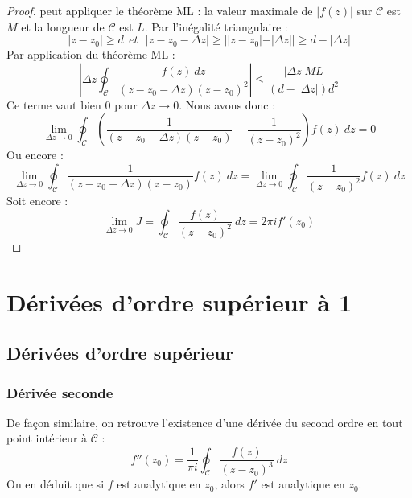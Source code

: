 \begin{proof}
	peut appliquer le théorème ML : la valeur maximale de $|f(z)|$ sur $\mathcal{C}$ est $M$ et la
	longueur de $\mathcal{C}$ est $L$. Par l'inégalité triangulaire :
	\begin{equation}
	|z-z_0| \geq d\ \ et\ \ \ |z-z_0-\Delta z| \geq ||z-z_0| - |\Delta z|| \geq d - |\Delta z|
	\end{equation}
	Par application du théorème ML :
	\begin{equation}
	\left|\Delta z\oint_\mathcal{C} \dfrac{f(z)\ dz}{(z-z_0-\Delta z)(z-z_0)^2}\right| \leq 
	\dfrac{|\Delta z|ML}{(d-|\Delta z|)d^2}
	\end{equation}
	Ce terme vaut bien 0 pour $\Delta z \rightarrow 0$. Nous avons donc :
	\begin{equation}
	\lim\limits_{\Delta z \rightarrow 0} \oint_\mathcal{C}\left(\dfrac{1}{(z-z_0-\Delta z)(z-z_0)} - 
	\dfrac{1}{(z-z_0)^2}\right)f(z)\ dz = 0
	\end{equation}
	Ou encore :
	\begin{equation}
	\lim\limits_{\Delta z \rightarrow 0} \oint_\mathcal{C}\dfrac{1}{(z-z_0-\Delta z)(z-z_0)}
	f(z)\ dz =
	\lim\limits_{\Delta z \rightarrow 0}\oint_\mathcal{ C}\dfrac{1}{(z-z_0)^2}f(z)\ dz
	\end{equation}
	Soit encore :
	\begin{equation}
	\lim\limits_{\Delta z \rightarrow 0} J = \oint_\mathcal{C}\frac{f(z)}{(z-z_0)^2}\ dz = 2\pi i
	f'(z_0)
	\end{equation}
    \end{proof}
    
\section{Dérivées d'ordre supérieur à 1}
	\subsection{Dérivées d'ordre supérieur}
		\subsubsection{Dérivée seconde}
		De façon similaire, on retrouve l'existence d'une dérivée du second ordre en tout point
		intérieur à $\mathcal{C}$ :
		\begin{equation}
		f''(z_0) = \frac{1}{\pi i}\oint_\mathcal{C}\dfrac{f(z)}{(z-z_0)^ 3}\ dz
		\end{equation}
		On en déduit que si $f$ est analytique en $z_0$, alors $f'$ est analytique en $z_0$.\ \\
		
